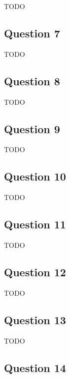 \documentclass[12pt, letterpaper, oneside]{book}
\begin{document}
TODO

\subsection{Question 7}

TODO

\subsection{Question 8}

TODO

\subsection{Question 9}

TODO

\subsection{Question 10}

TODO

\subsection{Question 11}

TODO

\subsection{Question 12}

TODO

\subsection{Question 13}

TODO

\subsection{Question 14}
\end{document}
